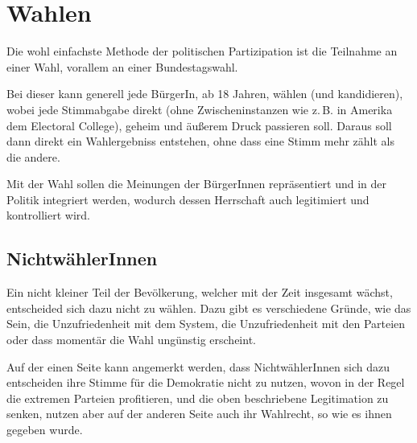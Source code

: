 \documentclass{article}
\begin{document}
\section{Wahlen}
Die wohl einfachste Methode der politischen Partizipation ist die Teilnahme an einer Wahl, vorallem an einer Bundestagswahl.
 
Bei dieser kann generell jede BürgerIn, ab 18 Jahren, wählen (und kandidieren), wobei jede Stimmabgabe direkt (ohne Zwischeninstanzen wie z.\,B. in Amerika dem Electoral College), geheim und äußerem Druck passieren soll. Daraus soll dann direkt ein Wahlergebniss entstehen, ohne dass eine Stimm mehr zählt als die andere.
 
Mit der Wahl sollen die Meinungen der BürgerInnen repräsentiert und in der Politik integriert werden, wodurch dessen Herrschaft auch legitimiert und kontrolliert wird.
 
\subsection{NichtwählerInnen}
Ein nicht kleiner Teil der Bevölkerung, welcher mit der Zeit insgesamt wächst, entscheided sich dazu nicht zu wählen. Dazu gibt es verschiedene Gründe, wie das  Sein, die Unzufriedenheit mit dem System, die Unzufriedenheit mit den Parteien oder dass momentär die Wahl ungünstig erscheint.
 
Auf der einen Seite kann angemerkt werden, dass NichtwählerInnen sich dazu entscheiden ihre Stimme für die Demokratie nicht zu nutzen, wovon in der Regel die extremen Parteien profitieren, und die oben beschriebene Legitimation zu senken, nutzen aber auf der anderen Seite auch ihr Wahlrecht, so wie es ihnen gegeben wurde.
\end{document}
